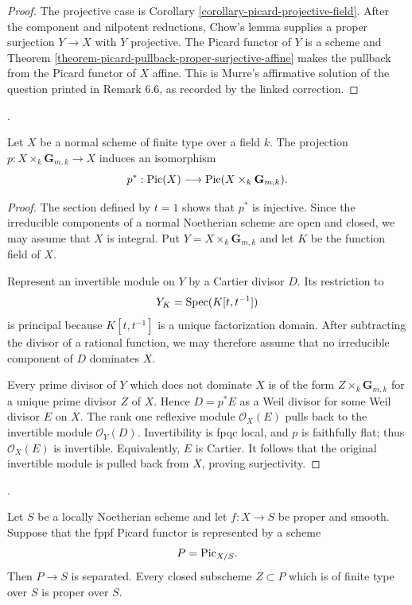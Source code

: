 \begin{proof}
The projective case is Corollary \ref{corollary-picard-projective-field}.
After the component and nilpotent reductions, Chow's lemma supplies a proper
surjection $Y \to X$ with $Y$ projective. The Picard functor of $Y$ is a
scheme and Theorem \ref{theorem-picard-pullback-proper-surjective-affine}
makes the pullback from the Picard functor of $X$ affine. This is Murre's
affirmative solution of the question printed in Remark 6.6, as recorded by
the linked correction.
\end{proof}

\begin{lemma}
\label{lemma-pic-normal-laurent-invariance}
\begin{reference}
\cite[Expos\'e 236, proof of Theorem 2.1(ii), pp. 231--232 and correction,
p. 303]{FGA}.
\end{reference}
Let $X$ be a normal scheme of finite type over a field $k$. The projection
$p : X\times_k\mathbf G_{m,k}\to X$ induces an isomorphism
$$
p^* : \mathop{\mathrm{Pic}}\nolimits(X)\longrightarrow \mathop{\mathrm{Pic}}\nolimits(X\times_k\mathbf G_{m,k}).
$$
\end{lemma}

\begin{proof}
The section defined by $t=1$ shows that $p^*$ is injective. Since the
irreducible components of a normal Noetherian scheme are open and closed, we
may assume that $X$ is integral. Put $Y=X\times_k\mathbf G_{m,k}$ and let
$K$ be the function field of $X$.

Represent an invertible module on $Y$ by a Cartier divisor $D$. Its
restriction to
$$
Y_K=\mathop{\mathrm{Spec}}(K[t,t^{-1}])
$$
is principal because $K[t,t^{-1}]$ is a unique factorization domain. After
subtracting the divisor of a rational function, we may therefore assume that
no irreducible component of $D$ dominates $X$.

Every prime divisor of $Y$ which does not dominate $X$ is of the form
$Z\times_k\mathbf G_{m,k}$ for a unique prime divisor $Z$ of $X$. Hence
$D=p^*E$ as a Weil divisor for some Weil divisor $E$ on $X$. The rank one
reflexive module $\mathcal{O}_X(E)$ pulls back to the invertible module
$\mathcal{O}_Y(D)$. Invertibility is fpqc local, and $p$ is faithfully flat;
thus $\mathcal{O}_X(E)$ is invertible. Equivalently, $E$ is Cartier. It
follows that the original invertible module is pulled back from $X$, proving
surjectivity.
\end{proof}

\begin{theorem}
\label{theorem-picard-smooth-proper-pieces}
\begin{reference}
\cite[Expos\'e 236, Theorem 2.1(i) and Corollary 2.4,
pp. 231--232]{FGA}.
\end{reference}
Let $S$ be a locally Noetherian scheme and let $f:X\to S$ be proper and
smooth. Suppose that the fppf Picard functor is represented by a scheme
$$
P=\mathrm{Pic}_{X/S}.
$$
Then $P\to S$ is separated. Every closed subscheme $Z\subset P$ which is of
finite type over $S$ is proper over $S$.
\end{theorem}

